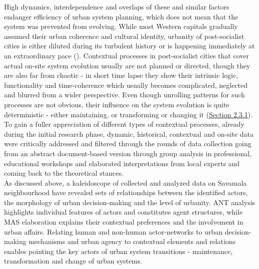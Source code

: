 \documentclass[11pt]{report}
\begin{document}
High dynamics, interdependence and overlaps of these and similar factors endanger efficiency of urban system planning, which does not mean that the system was prevented from evolving.
While most Western capitals gradually assumed their urban coherence and cultural identity, urbanity of post-socialist cities is either diluted during its turbulent history or is happening immediately at an extraordinary pace (\href{Doytchinov}{\cite{doytchinov_modernization_2015}}).
Contextual processes in post-socialist cities that cover actual on-site system evolution usually are not planned or directed, though they are also far from chaotic - in short time lapse they show their intrinsic logic, functionality and time-coherence which usually becomes complicated, neglected and blurred from a wider perspective.
Even though unrolling patterns for such processes are not obvious, their influence on the system evolution is quite deterministic - either maintaining, or transforming or changing it (\href{Section 2.3.1}{Section 2.3.1}). 
\\

To gain a fuller appreciation of different types of contextual processes, already during the initial research phase, dynamic, historical, contextual and on-site data were critically addressed and filtered through the rounds of data collection going from an abstract document-based version through group analysis in professional, educational workshops and elaborated interpretations from local experts and coming back to the theoretical stances.
\\

As discussed above, a kaleidoscope of collected and analyzed data on Savamala neighbourhood have revealed sets of relationships between the identified actors, the morphology of urban decision-making and the level of urbanity.
ANT analysis highlights individual features of actors and constitutes agent structures, while MAS elaboration explains their contextual preferences and the involvement in urban affairs.
Relating human and non-human actor-networks to urban decision- making mechanisms and urban agency to contextual elements and relations enables pointing the key actors of urban system  transitions - maintenance, transformation and change of urban systems.
\\
\end{document}
